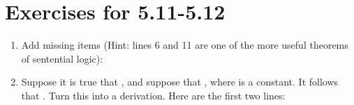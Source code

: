 \section*{Exercises for 5.11-5.12}

\begin{enumerate}


 \item Add missing items (Hint: lines 6 and 11  are one of the more useful 
  theorems of sentential logic):


\begin{argumentN}[1]















\end{argumentN}



 \item Suppose it is true that , and suppose that 
  , where  is a constant. It follows that . Turn this into a 
  derivation. Here are the first two lines:
  

\end{enumerate}
